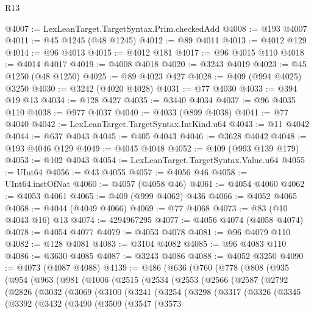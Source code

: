 \begin{lexlean}{R13}
\begin{coremodule}
{{{{{{{{{{{{{{{{{{{{{{{{{{{{{{{{{{{{{{{{{{{{{{{{{{{{{{{{{{{{{{{{{{{{{{{{{{{{{{{{{{{{{{{{{{{{{{{{{{{{{{{{{{@4007 := LexLeanTarget.TargetSyntax.Prim.checkedAdd
@4008 := @193 @4007
@4011 := @45 @1245 (@48 @1245)
@4012 := @89 @4011
@4013 := @4012 @129
@4014 := @96 @4013
@4015 := @4012 @181
@4017 := @96 @4015 @110
@4018 := @4014 @4017
@4019 := @4008 @4018
@4020 := @3243 @4019
@4023 := @45 @1250 (@48 @1250)
@4025 := @89 @4023 @427
@4028 := @409 (@994 @4025) @3250
@4030 := @3242 (@4020 @4028)
@4031 := @77 @4030
@4033 := @394 @19 @13
@4034 := @128 @427
@4035 := @3440 @4034
@4037 := @96 @4035 @110
@4038 := @977 @4037
@4040 := @4033 (@899 @4038)
@4041 := @77 @4040
@4042 := LexLeanTarget.TargetSyntax.IntKind.u64
@4043 := @11 @4042
@4044 := @637 @4043
@4045 := @405 @4043
@4046 := @3628 @4042
@4048 := @193 @4046 @129
@4049 := @4045 @4048
@4052 := @409 (@993 @139 @179)
@4053 := @102 @4043
@4054 := LexLeanTarget.TargetSyntax.Value.u64
@4055 := UInt64
@4056 := @43 @4055
@4057 := @4056 @46
@4058 := UInt64.instOfNat
@4060 := @4057 (@4058 @46)
@4061 := @4054 @4060
@4062 := @4053 @4061
@4065 := @409 (@999 @4062) @436
@4066 := @4052 @4065
@4068 := @4044 (@4049 @4066)
@4069 := @77 @4068
@4073 := @83 (@10 @4043 @16) @13
@4074 := 4294967295
@4077 := @4056 @4074 (@4058 @4074)
@4078 := @4054 @4077
@4079 := @4053 @4078
@4081 := @96 @4079 @110
@4082 := @128 @4081
@4083 := @3104 @4082
@4085 := @96 @4083 @110
@4086 := @3630 @4085
@4087 := @3243 @4086
@4088 := @4052 @3250
@4090 := @4073 (@4087 @4088)
@4139 := @486
    (@636
      (@760
        (@778
          (@808
            (@935
              (@954
                (@963
                  (@981
                    (@1006
                      (@2515
                        (@2534
                          (@2553
                            (@2566
                              (@2587
                                (@2792
                                  (@2826
                                    (@3032
                                      (@3069
                                        (@3100
                                          (@3241
                                            (@3254
                                              (@3298
                                                (@3317
                                                  (@3326
                                                    (@3345
                                                      (@3392
                                                        (@3432
                                                          (@3490
                                                            (@3509
                                                              (@3547
                                                                (@3573
}}}}}}}}}}}}}}}}}}}}}}}}}}}}}}}}}}}}}}}}}}}}}}}}}}}}}}}}}}}}}}}}}}}}}}}}}}}}}}}}}}}}}}}}}}}}}}}}}}}}}}}}}}
\end{coremodule}
\end{lexlean}
